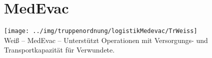\section{MedEvac}
\texttt{[image: ../img/truppenordnung/logistikMedevac/TrWeiss]}\\
Weiß -- \acf{MedEvac} -- Unterstützt Operationen mit Versorgungs- und Transportkapazität für Verwundete.